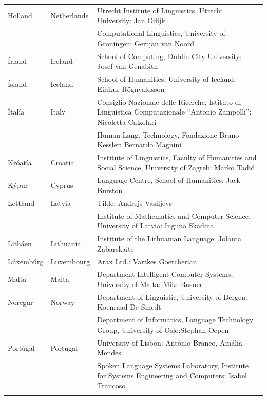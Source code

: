 \begin{longtable}{llp{115mm}}
  Holland & \textcolor{grey1}{Netherlands} & Utrecht Institute of Linguistics, Utrecht University: Jan Odijk\\ \addlinespace 
  & & Computational Linguistics, University of Groningen: Gertjan van Noord\\ \addlinespace
  Írland & \textcolor{grey1}{Ireland} & School of Computing, Dublin City University: Josef van Genabith\\ \addlinespace
  Ísland & \textcolor{grey1}{Iceland} & School of Humanities, University of Iceland: Eiríkur Rögnvaldsson\\ \addlinespace
  Ítalía & \textcolor{grey1}{Italy} & Consiglio Nazionale delle Ricerche, Istituto di Linguistica Computazionale \newline “Antonio Zampolli”: Nicoletta Calzolari\\ \addlinespace
  & & Human Lang. Technology, Fondazione Bruno Kessler: Bernardo Magnini\\ \addlinespace 
  Króatía & \textcolor{grey1}{Croatia} & Institute of Linguistics, Faculty of Humanities and Social Science, University of Zagreb: Marko Tadić \\ \addlinespace
  Kýpur & \textcolor{grey1}{Cyprus} & Language Centre, School of Humanities: Jack Burston\\ \addlinespace 
  Lettland & \textcolor{grey1}{Latvia} & Tilde: Andrejs Vasiļjevs\\ \addlinespace 
  & & Institute of Mathematics and Computer Science, University of Latvia: Inguna Skadiņa\\ \addlinespace
  Litháen & \textcolor{grey1}{Lithuania} & Institute of the Lithuanian Language: Jolanta Zabarskaitė\\ \addlinespace
  Lúxembúrg & \textcolor{grey1}{Luxembourg} & Arax Ltd.: Vartkes Goetcherian\\ \addlinespace
  Malta & \textcolor{grey1}{Malta} & Department Intelligent Computer Systems, University of Malta: Mike Rosner\\ \addlinespace
  Noregur & \textcolor{grey1}{Norway} & Department of Linguistic, University of Bergen: Koenraad De Smedt\\ \addlinespace 
  & & Department of Informatics, Language Technology Group, University of Oslo:\newline Stephan Oepen \\ \addlinespace
  Portúgal & \textcolor{grey1}{Portugal} & University of Lisbon: António Branco, Amália Mendes \\ \addlinespace
  & & Spoken Language Systems Laboratory, Institute for Systems Engineering and Computers: Isabel Trancoso \\ \addlinespace

\end{longtable}
